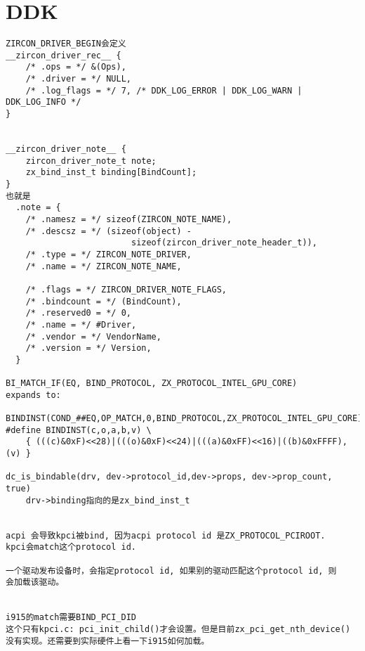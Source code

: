\section{DDK}

\begin{verbatim}
ZIRCON_DRIVER_BEGIN会定义
__zircon_driver_rec__ {
    /* .ops = */ &(Ops),
    /* .driver = */ NULL,
    /* .log_flags = */ 7, /* DDK_LOG_ERROR | DDK_LOG_WARN | DDK_LOG_INFO */
}


__zircon_driver_note__ {
    zircon_driver_note_t note;
    zx_bind_inst_t binding[BindCount];
}
也就是
  .note = {
    /* .namesz = */ sizeof(ZIRCON_NOTE_NAME),              
    /* .descsz = */ (sizeof(object) -                       
                         sizeof(zircon_driver_note_header_t)), 
    /* .type = */ ZIRCON_NOTE_DRIVER,                      
    /* .name = */ ZIRCON_NOTE_NAME,  
    
    /* .flags = */ ZIRCON_DRIVER_NOTE_FLAGS,                    
    /* .bindcount = */ (BindCount),                             
    /* .reserved0 = */ 0,                                       
    /* .name = */ #Driver,                                      
    /* .vendor = */ VendorName,                                 
    /* .version = */ Version,            
  }

BI_MATCH_IF(EQ, BIND_PROTOCOL, ZX_PROTOCOL_INTEL_GPU_CORE)
expands to:

BINDINST(COND_##EQ,OP_MATCH,0,BIND_PROTOCOL,ZX_PROTOCOL_INTEL_GPU_CORE)
#define BINDINST(c,o,a,b,v) \
    { (((c)&0xF)<<28)|(((o)&0xF)<<24)|(((a)&0xFF)<<16)|((b)&0xFFFF),(v) }

dc_is_bindable(drv, dev->protocol_id,dev->props, dev->prop_count, true)
    drv->binding指向的是zx_bind_inst_t


acpi 会导致kpci被bind, 因为acpi protocol id 是ZX_PROTOCOL_PCIROOT.
kpci会match这个protocol id.

一个驱动发布设备时，会指定protocol id, 如果别的驱动匹配这个protocol id, 则
会加载该驱动。


i915的match需要BIND_PCI_DID
这个只有kpci.c: pci_init_child()才会设置。但是目前zx_pci_get_nth_device()
没有实现。还需要到实际硬件上看一下i915如何加载。

\end{verbatim}